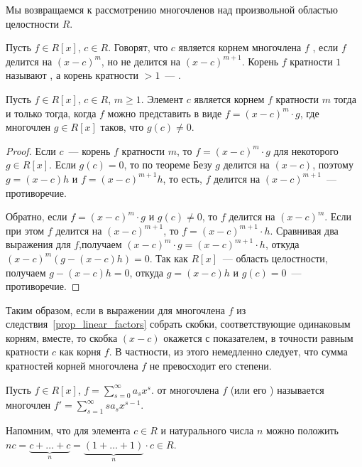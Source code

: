 Мы возвращаемся к рассмотрению многочленов над произвольной областью
целостности $R$.

\begin{definition}
Пусть $f\in R[x]$, $c\in R$. Говорят, что $c$ является корнем
многочлена $f$
, если $f$
делится на $(x-c)^m$, но
не делится на $(x-c)^{m+1}$. Корень $f$ кратности $1$ называют
, а корень
кратности $>1$~--- .
\end{definition}

\begin{lemma}\label{lem_root_multiplicity_equiv}
Пусть $f\in R[x]$, $c\in R$, $m\geq 1$. Элемент $c$ является корнем
$f$ кратности
$m$ тогда и только тогда, когда $f$ можно представить в виде
$f=(x-c)^m\cdot g$, где многочлен $g\in R[x]$ таков, что $g(c)\neq 0$.
\end{lemma}
\begin{proof}
Если $c$~--- корень $f$ кратности $m$, то $f=(x-c)^m\cdot g$ для
некоторого $g\in R[x]$. Если $g(c)=0$, то по теореме Безу $g$ делится
на $(x-c)$, поэтому $g=(x-c)h$ и $f=(x-c)^{m+1}h$, то есть, $f$
делится на $(x-c)^{m+1}$~--- противоречие.

Обратно, если $f=(x-c)^m\cdot g$ и $g(c)\neq 0$, то $f$ делится на
$(x-c)^m$. Если при этом $f$ делится на $(x-c)^{m+1}$, то
$f=(x-c)^{m+1}\cdot h$. Сравнивая два выражения для $f$,получаем
$(x-c)^m\cdot g=(x-c)^{m+1}\cdot h$, откуда $(x-c)^m(g-(x-c)h)=0$. Так
как $R[x]$~--- область целостности, получаем $g-(x-c)h=0$, откуда
$g=(x-c)h$ и $g(c)=0$~--- противоречие.
\end{proof}

\begin{remark}\label{rem_number_of_roots_with_multiplicities}
Таким образом, если в выражении для многочлена $f$ из
следствия~\ref{prop_linear_factors} собрать скобки,
соответствующие одинаковым корням, вместе, то скобка $(x-c)$ окажется
с показателем, в точности равным кратности $c$ как корня $f$.
В частности, из этого немедленно следует, что сумма кратностей корней
многочлена $f$ не превосходит его степени.
\end{remark}

\begin{definition}
Пусть $f\in R[x]$, $f=\sum_{s=0}^\infty a_sx^s$.
 от многочлена $f$
(или его ) называется многочлен
$f'=\sum_{s=1}^\infty sa_sx^{s-1}$.
\end{definition}
\begin{remark}
Напомним, что для элемента $c\in R$ и натурального числа $n$ можно
положить
$nc=\underbrace{c+\dots+c}_{n}=\underbrace{(1+\dots+1)}_{n}\cdot c\in R$.
\end{remark}

